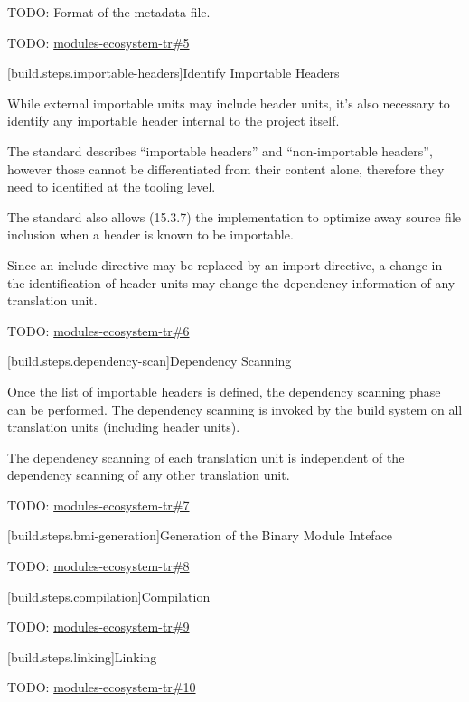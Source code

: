 \pnum TODO: Format of the metadata file.

\pnum TODO: \href{https://github.com/cplusplus/modules-ecosystem-tr/issues/5}{modules-ecosystem-tr\#5}

[build.steps.importable-headers]{Identify Importable Headers}

\pnum While external importable units may include header units, it's
also necessary to identify any importable header internal to the
project itself.

\pnum The \Cpp{} standard describes ``importable headers'' and
``non-importable headers'', however those cannot be differentiated
from their content alone, therefore they need to identified at the
tooling level.

\pnum The \Cpp{} standard also allows (15.3.7) the implementation to
optimize away source file inclusion when a header is known to be
importable.

\pnum Since an include directive may be replaced by an import
directive, a change in the identification of header units may change
the dependency information of any translation unit.

\pnum TODO: \href{https://github.com/cplusplus/modules-ecosystem-tr/issues/6}{modules-ecosystem-tr\#6}

[build.steps.dependency-scan]{Dependency Scanning}

\pnum Once the list of importable headers is defined, the dependency
scanning phase can be performed. The dependency scanning is invoked by
the build system on all translation units (including header units).

\pnum The dependency scanning of each translation unit is independent
of the dependency scanning of any other translation unit.

\pnum TODO: \href{https://github.com/cplusplus/modules-ecosystem-tr/issues/7}{modules-ecosystem-tr\#7}

[build.steps.bmi-generation]{Generation of the Binary Module Inteface}

\pnum TODO: \href{https://github.com/cplusplus/modules-ecosystem-tr/issues/8}{modules-ecosystem-tr\#8}

[build.steps.compilation]{Compilation}

\pnum TODO: \href{https://github.com/cplusplus/modules-ecosystem-tr/issues/9}{modules-ecosystem-tr\#9}

[build.steps.linking]{Linking}

\pnum TODO: \href{https://github.com/cplusplus/modules-ecosystem-tr/issues/10}{modules-ecosystem-tr\#10}


